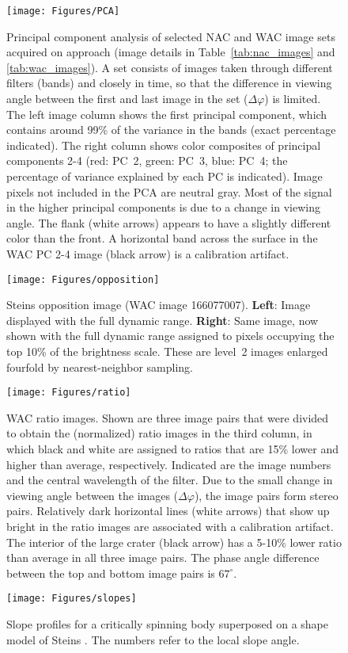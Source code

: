 \documentclass[preprint,3p,authoryear]{elsarticle}
\begin{document}

\begin{figure}
\centering
\texttt{[image: Figures/PCA]}
\caption{Principal component analysis of selected NAC and WAC image sets acquired on approach (image details in Table~\ref{tab:nac_images} and \ref{tab:wac_images}). A set consists of images taken through different filters (bands) and closely in time, so that the difference in viewing angle between the first and last image in the set ($\Delta \varphi$) is limited. The left image column shows the first principal component, which contains around 99\% of the variance in the bands (exact percentage indicated). The right column shows color composites of principal components 2-4 (red: PC~2, green: PC~3, blue: PC~4; the percentage of variance explained by each PC is indicated). Image pixels not included in the PCA are neutral gray. Most of the signal in the higher principal components is due to a change in viewing angle. The flank (white arrows) appears to have a slightly different color than the front. A horizontal band across the surface in the WAC PC 2-4 image (black arrow) is a calibration artifact.}
\label{fig:pca}
\end{figure}


\begin{figure}
\centering
\texttt{[image: Figures/opposition]}
\caption{Steins opposition image (WAC image 166077007). {\bf Left}: Image displayed with the full dynamic range. {\bf Right}: Same image, now shown with the full dynamic range assigned to pixels occupying the top 10\% of the brightness scale. These are level~2 images enlarged fourfold by nearest-neighbor sampling.}
\label{fig:opposition}
\end{figure}


\begin{figure}
\centering
\texttt{[image: Figures/ratio]}
\caption{WAC ratio images. Shown are three image pairs that were divided to obtain the (normalized) ratio images in the third column, in which black and white are assigned to ratios that are 15\% lower and higher than average, respectively. Indicated are the image numbers and the central wavelength of the filter. Due to the small change in viewing angle between the images ($\Delta \varphi$), the image pairs form stereo pairs. Relatively dark horizontal lines (white arrows) that show up bright in the ratio images are associated with a calibration artifact. The interior of the large crater (black arrow) has a 5-10\% lower ratio than average in all three image pairs. The phase angle difference between the top and bottom image pairs is $67^\circ$.}
\label{fig:ratio}
\end{figure}


\begin{figure}
\centering
\texttt{[image: Figures/slopes]}
\caption{Slope profiles for a critically spinning body \citep{H09} superposed on a shape model of Steins \citep{K09}. The numbers refer to the local slope angle.}
\label{fig:slopes}
\end{figure}
\end{document}
